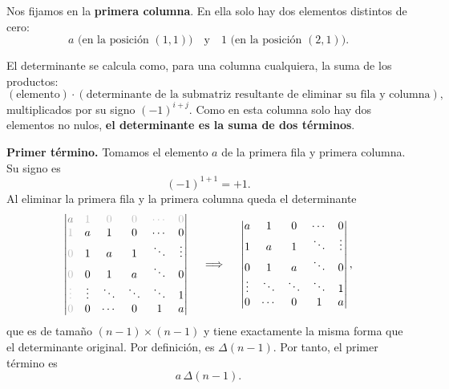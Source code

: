 \documentclass[a4paper,12pt]{article}
\begin{document}
\begin{ejercicio}[title=Ejercicio 40]
Nos fijamos en la \textbf{primera columna}. En ella solo hay dos elementos distintos de cero:
\[
a \text{ (en la posición $(1,1)$)} \quad \text{y} \quad 1 \text{ (en la posición $(2,1)$)}.
\]

El determinante se calcula como, para una columna cualquiera, la suma de los productos:
\[
(\text{elemento})\cdot(\text{determinante de la submatriz resultante de eliminar su fila y columna}),
\]
multiplicados por su signo $(-1)^{i+j}$.  
Como en esta columna solo hay dos elementos no nulos, \textbf{el determinante es la suma de dos términos}.

\bigskip

\textbf{Primer término.}  
Tomamos el elemento $a$ de la primera fila y primera columna. Su signo es
\[
(-1)^{1+1}=+1.
\]
Al eliminar la primera fila y la primera columna queda el determinante
\[
\begin{vmatrix}
\color{gray}{a} & \color{lightgray}{1} & \color{lightgray}{0} & \color{lightgray}{0} & \color{lightgray}\cdots & \color{lightgray}{0}\\
\color{lightgray}{1} & a & 1 & 0 & \cdots & 0\\
\color{lightgray}{0} & 1 & a & 1 & \ddots & \vdots\\
\color{lightgray}{0} & 0 & 1 & a & \ddots & 0\\
\color{lightgray}\vdots & \vdots & \ddots & \ddots & \ddots & 1\\
\color{lightgray}{0} & 0 & \cdots & 0 & 1 & a
\end{vmatrix}
\quad\implies\quad
\begin{vmatrix}
a & 1 & 0 & \cdots & 0\\
1 & a & 1 & \ddots & \vdots\\
0 & 1 & a & \ddots & 0\\
\vdots & \ddots & \ddots & \ddots & 1\\
0 & \cdots & 0 & 1 & a
\end{vmatrix},
\]
que es de tamaño $(n-1)\times(n-1)$ y tiene exactamente la misma forma que el determinante original.  
Por definición, es $\Delta(n-1)$.  
Por tanto, el primer término es
\[
a\,\Delta(n-1).
\]

\medskip


\end{ejercicio}
\end{document}
